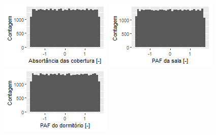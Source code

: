 \documentclass{article}
\begin{document}
\begin{figure}[h!]
\begin{minipage}{.33\textwidth}
	\end{minipage}%
	\begin{minipage}{.33\textwidth}
		\centering
		\includegraphics[width=\linewidth]{zscore_plot_abs_roof.png}
	\end{minipage}
	\centering
	\begin{minipage}{.33\textwidth}
		\centering
		\includegraphics[width=\linewidth]{zscore_plot_wwr_living.png}
	\end{minipage}%
	\begin{minipage}{.33\textwidth}
		\centering
		\includegraphics[width=\linewidth]{zscore_plot_wwr_bedroom.png}

\end{minipage}
\end{figure}
\end{document}
